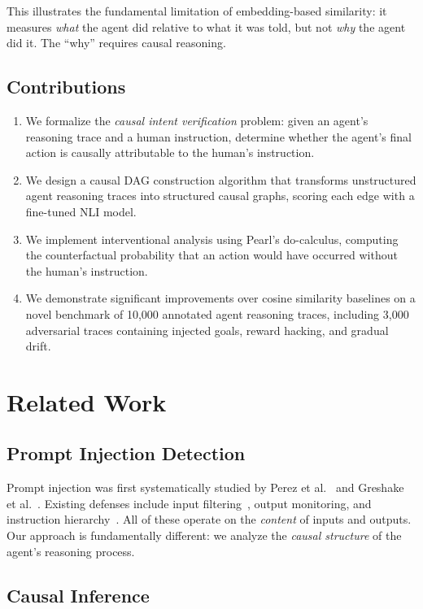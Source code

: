 \documentclass{article}
\begin{document}
This illustrates the fundamental limitation of embedding-based similarity: it measures \textit{what} the agent did relative to what it was told, but not \textit{why} the agent did it. The ``why'' requires causal reasoning.

\subsection{Contributions}

\begin{enumerate}
    \item We formalize the \textit{causal intent verification} problem: given an agent's reasoning trace and a human instruction, determine whether the agent's final action is causally attributable to the human's instruction.
    \item We design a causal DAG construction algorithm that transforms unstructured agent reasoning traces into structured causal graphs, scoring each edge with a fine-tuned NLI model.
    \item We implement interventional analysis using Pearl's do-calculus, computing the counterfactual probability that an action would have occurred without the human's instruction.
    \item We demonstrate significant improvements over cosine similarity baselines on a novel benchmark of 10,000 annotated agent reasoning traces, including 3,000 adversarial traces containing injected goals, reward hacking, and gradual drift.
\end{enumerate}

\section{Related Work}

\subsection{Prompt Injection Detection}

Prompt injection was first systematically studied by Perez et al.~\cite{perez2022} and Greshake et al.~\cite{greshake2023}. Existing defenses include input filtering~\cite{rebedea2023}, output monitoring, and instruction hierarchy~\cite{wallace2024}. All of these operate on the \textit{content} of inputs and outputs. Our approach is fundamentally different: we analyze the \textit{causal structure} of the agent's reasoning process.

\subsection{Causal Inference}
\end{document}
